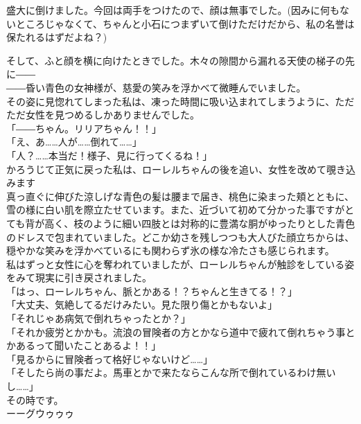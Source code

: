 \documentclass[oneside, a4paper]{jsbook}
\begin{document}
盛大に倒けました。今回は両手をつけたので、顔は無事でした。(因みに何もないところじゃなくて、ちゃんと小石につまずいて倒けただけだから、私の名誉は保たれるはずだよね？)

そして、ふと顔を横に向けたときでした。木々の隙間から漏れる天使の梯子の先に――\\

――昏い青色の女神様が、慈愛の笑みを浮かべて微睡んでいました。\\

その姿に見惚れてしまった私は、凍った時間に吸い込まれてしまうように、ただただ女性を見つめるしかありませんでした。\\

\noindent
「――ちゃん。リリアちゃん！！」\\
「え、あ……人が……倒れて……」\\
「人？……本当だ！様子、見に行ってくるね！」\\

かろうじて正気に戻った私は、ローレルちゃんの後を追い、女性を改めて覗き込みます\\

真っ直ぐに伸びた涼しげな青色の髪は腰まで届き、桃色に染まった頬とともに、雪の様に白い肌を際立たせています。また、近づいて初めて分かった事ですがとても背が高く、枝のように細い四肢とは対称的に豊満な胴がゆったりとした青色のドレスで包まれていました。どこか幼さを残しつつも大人びた顔立ちからは、穏やかな笑みを浮かべているにも関わらず氷の様な冷たさも感じられます。\\

私はずっと女性に心を奪われていましたが、ローレルちゃんが触診をしている姿をみて現実に引き戻されました。\\

\noindent
「はっ、ローレルちゃん、脈とかある！？ちゃんと生きてる！？」\\
「大丈夫、気絶してるだけみたい。見た限り傷とかもないよ」\\
「それじゃあ病気で倒れちゃったとか？」\\
「それか疲労とかかも。流浪の冒険者の方とかなら道中で疲れて倒れちゃう事とかあるって聞いたことあるよ！！」\\
「見るからに冒険者って格好じゃないけど……」\\
「そしたら尚の事だよ。馬車とかで来たならこんな所で倒れているわけ無いし……」\\

その時です。\\

ーーグウゥゥゥ
\end{document}
